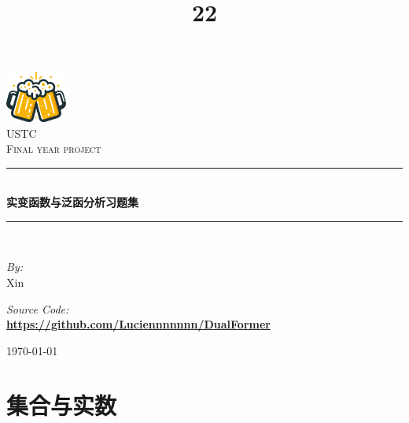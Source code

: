 \documentclass{article}
\title{22}
\newcommand{\HRule}{\rule{\linewidth}{0.5mm}}
\begin{document}
\begin{titlepage}

\begin{center}


\includegraphics[width=0.15\textwidth]{figures/Clinking Beer Mugs.pdf}\\[1cm]    

\textsc{\LARGE USTC}\\[1.5cm]

\textsc{\Large Final year project}\\[0.5cm]


\HRule \\[0.4cm]
{ \huge \bfseries 实变函数与泛函分析习题集}\\[0.4cm]

\HRule \\[1.5cm]

\begin{minipage}{0.4\textwidth}
\begin{flushleft} \large
\emph{By:}\\
Xin
\end{flushleft}
\end{minipage}
\begin{minipage}{0.4\textwidth}
\begin{flushright} \large
\emph{Source Code:} \\
\textbf{\url{https://github.com/Luciennnnnnn/DualFormer}}
\end{flushright}
\end{minipage}

\vfill

{\large \today}

\end{center}

\end{titlepage}





\section{集合与实数}
\end{document}
